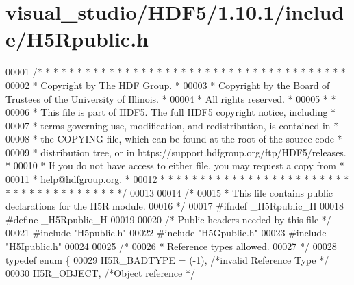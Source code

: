 \hypertarget{visual__studio_2_h_d_f5_21_810_81_2include_2_h5_rpublic_8h_source}{}\section{visual\+\_\+studio/\+H\+D\+F5/1.10.1/include/\+H5\+Rpublic.h}
\label{visual__studio_2_h_d_f5_21_810_81_2include_2_h5_rpublic_8h_source}

\begin{DoxyCode}
00001 \textcolor{comment}{/* * * * * * * * * * * * * * * * * * * * * * * * * * * * * * * * * * * * * * *}
00002 \textcolor{comment}{ * Copyright by The HDF Group.                                               *}
00003 \textcolor{comment}{ * Copyright by the Board of Trustees of the University of Illinois.         *}
00004 \textcolor{comment}{ * All rights reserved.                                                      *}
00005 \textcolor{comment}{ *                                                                           *}
00006 \textcolor{comment}{ * This file is part of HDF5.  The full HDF5 copyright notice, including     *}
00007 \textcolor{comment}{ * terms governing use, modification, and redistribution, is contained in    *}
00008 \textcolor{comment}{ * the COPYING file, which can be found at the root of the source code       *}
00009 \textcolor{comment}{ * distribution tree, or in https://support.hdfgroup.org/ftp/HDF5/releases.  *}
00010 \textcolor{comment}{ * If you do not have access to either file, you may request a copy from     *}
00011 \textcolor{comment}{ * help@hdfgroup.org.                                                        *}
00012 \textcolor{comment}{ * * * * * * * * * * * * * * * * * * * * * * * * * * * * * * * * * * * * * * */}
00013 
00014 \textcolor{comment}{/*}
00015 \textcolor{comment}{ * This file contains public declarations for the H5R module.}
00016 \textcolor{comment}{ */}
00017 \textcolor{preprocessor}{#ifndef \_H5Rpublic\_H}
00018 \textcolor{preprocessor}{#define \_H5Rpublic\_H}
00019 
00020 \textcolor{comment}{/* Public headers needed by this file */}
00021 \textcolor{preprocessor}{#include "H5public.h"}
00022 \textcolor{preprocessor}{#include "H5Gpublic.h"}
00023 \textcolor{preprocessor}{#include "H5Ipublic.h"}
00024 
00025 \textcolor{comment}{/*}
00026 \textcolor{comment}{ * Reference types allowed.}
00027 \textcolor{comment}{ */}
00028 \textcolor{keyword}{typedef} \textcolor{keyword}{enum} \{
00029     H5R\_BADTYPE     =   (-1),   \textcolor{comment}{/*invalid Reference Type                     */}
00030     H5R\_OBJECT,                 \textcolor{comment}{/*Object reference                           */}

\end{DoxyCode}
